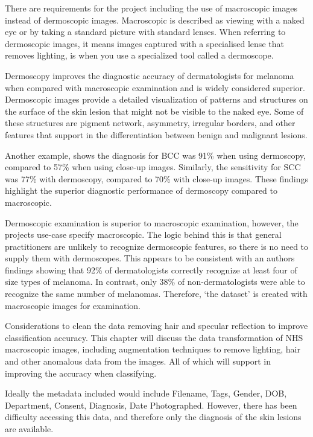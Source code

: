 There are requirements for the project including the use of macroscopic images instead of dermoscopic images. Macroscopic is described as viewing with a naked eye or by taking a standard picture with standard lenses. When referring to dermoscopic images, it means images captured with a specialised lense that removes lighting, is when you use a specialized tool called a dermoscope.

Dermoscopy improves the diagnostic accuracy of dermatologists for melanoma when compared with macroscopic examination\cite{Wolner2017} and is widely considered superior\cite{Thiers2009}. Dermoscopic images provide a detailed visualization of patterns and structures on the surface of the skin lesion that might not be visible to the naked eye\cite{Thiers2009}. Some of these structures are pigment network, asymmetry, irregular borders, and other features that support in the differentiation between benign and malignant lesions\cite{Thiers2009}. 

Another example, shows the diagnosis for BCC was 91\% when using dermoscopy, compared to 57\% when using close-up images\cite{Dascalu2022}. Similarly, the sensitivity for SCC was 77\% with dermoscopy, compared to 70\% with close-up images\cite{Dascalu2022}. These findings highlight the superior diagnostic performance of dermoscopy compared to macroscopic.

Dermoscopic examination is superior to macroscopic examination, however, the projects use-case specify macroscopic. The logic behind this is that general practitioners are unlikely to recognize dermoscopic features, so there is no need to supply them with dermoscopes.  This appears to be consistent with an authors findings showing that 92\% of dermatologists correctly recognize at least four of size types of melanoma. In contrast, only 38\% of non-dermatologists were able to recognize the same number of melanomas\cite{Tae2019}. Therefore, `the dataset' is created with macroscopic images for examination.

Considerations to clean the data removing hair and specular reflection to improve classification accuracy. This chapter will discuss the data transformation of NHS macroscopic images, including augmentation techniques to remove lighting, hair and other anomalous data from the images. All of which will support in improving the accuracy when classifying.

Ideally the metadata included would include Filename, Tags, Gender, DOB, Department, Consent, Diagnosis, Date Photographed. However, there has been difficulty accessing this data, and therefore only the diagnosis of the skin lesions are available.

